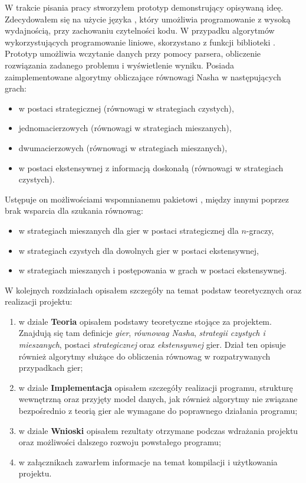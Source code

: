 \documentclass[polish]{standalone}
\begin{document}
W trakcie pisania pracy stworzyłem prototyp demonstrujący opisywaną ideę. Zdecydowałem się na użycie języka ,
który umożliwia programowanie z wysoką wydajnością, przy zachowaniu czytelności kodu. W przypadku algorytmów
wykorzystujących programowanie liniowe, skorzystano z funkcji biblioteki . Prototyp umożliwia wczytanie
danych przy pomocy parsera, obliczenie rozwiązania zadanego problemu i wyświetlenie wyniku. Posiada zaimplementowane
algorytmy obliczające równowagi Nasha w następujących grach:
\begin{itemize}
\item w postaci strategicznej (równowagi w strategiach czystych),
\item jednomacierzowych (równowagi w strategiach mieszanych),
\item dwumacierzowych (równowagi w strategiach mieszanych),
\item w postaci ekstensywnej z informacją doskonałą (równowagi w strategiach czystych).
\end{itemize}
Ustępuje on możliwościami wspomnianemu pakietowi , między innymi poprzez brak wsparcia dla szukania
równowag:
\begin{itemize}
\item w strategiach mieszanych dla gier w postaci strategicznej dla $n$-graczy,
\item w strategiach czystych dla dowolnych gier w postaci ekstensywnej,
\item w strategiach mieszanych i postępowania w grach w postaci ekstensywnej.
\end{itemize}

W kolejnych rozdziałach opisałem szczegóły na temat podstaw teoretycznych oraz realizacji projektu:
\begin{enumerate}
\item w dziale \textbf{Teoria} opisałem podstawy teoretyczne stojące za projektem. Znajdują się tam definicje
\textit{gier}, \textit{równowag Nasha}, \textit{strategii czystych i mieszanych}, postaci \textit{strategicznej}
oraz \textit{ekstensywnej} gier. Dział ten opisuje również algorytmy służące do obliczenia równowag w rozpatrywanych
przypadkach gier;
\item w dziale \textbf{Implementacja} opisałem szczegóły realizacji programu, strukturę wewnętrzną oraz przyjęty model
danych, jak również algorytmy nie związane bezpośrednio z teorią gier ale wymagane do poprawnego działania programu;
\item w dziale \textbf{Wnioski} opisałem rezultaty otrzymane podczas wdrażania projektu oraz możliwości dalszego
rozwoju powstałego programu;
\item w załącznikach zawarłem informacje na temat kompilacji i użytkowania projektu.
\end{enumerate}
\end{document}

